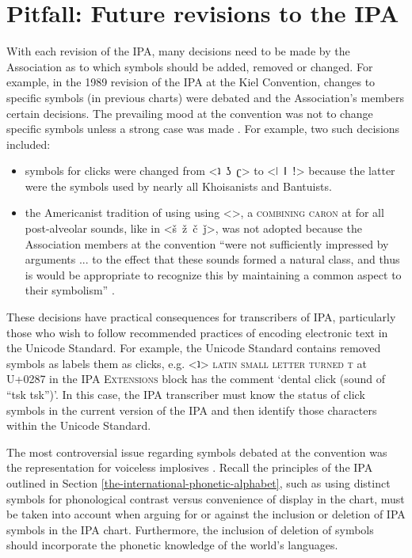 \section{Pitfall: Future revisions to the IPA}
\label{ipa-revisions}

With each revision of the IPA, many decisions need to be made by 
the Association as to which symbols should be added, removed or 
changed. For example, in the 1989 revision of the IPA at the Kiel Convention, 
changes to specific symbols (in previous charts) were debated and 
the Association's members certain decisions. The prevailing mood at 
the convention was not to change specific symbols unless a strong 
case was made \cite{Ladefoged1990a}. For example, two such decisions 
included:

\begin{itemize}
	\item symbols for clicks were changed from <ʇ~ʖ~ʗ> to <ǀ~ǁ~ǃ>
       because the latter were the symbols used by nearly all Khoisanists and
       Bantuists.
	\item the Americanist tradition of using using <>, a
       \textsc{combining caron} at  for all post-alveolar sounds, like
       in <š~ž~č~ǰ>, was not adopted because the Association members at the
       convention ``were not sufficiently impressed by arguments ... to the
       effect that these sounds formed a natural class, and thus is would be
       appropriate to recognize this by maintaining a common aspect to their
       symbolism'' \citep[62]{Ladefoged1990a}. 
\end{itemize}

\noindent These decisions have practical consequences for transcribers 
of IPA, particularly those who wish to follow recommended practices of 
encoding electronic text in the Unicode Standard. For example, the Unicode 
Standard contains removed symbols as labels them as clicks, e.g. <ʇ> 
\textsc{latin small letter turned t} at U+0287 in the \textsc{IPA Extensions} 
block has the comment `dental click (sound of ``tsk tsk'')'. In this case, 
the IPA transcriber must know the status of click symbols in the current 
version of the IPA and then identify those characters within the Unicode Standard. 

The most controversial issue regarding symbols debated at the convention 
was the representation for voiceless implosives \cite[62]{Ladefoged1990a}. 
Recall the principles of the IPA outlined in Section \ref{the-international-phonetic-alphabet}, 
such as using distinct symbols for phonological contrast versus convenience of 
display in the chart, must be taken into account when arguing for or against 
the inclusion or deletion of IPA symbols in the IPA chart. Furthermore, the 
inclusion of deletion of symbols should incorporate the phonetic knowledge 
of the world's languages.

